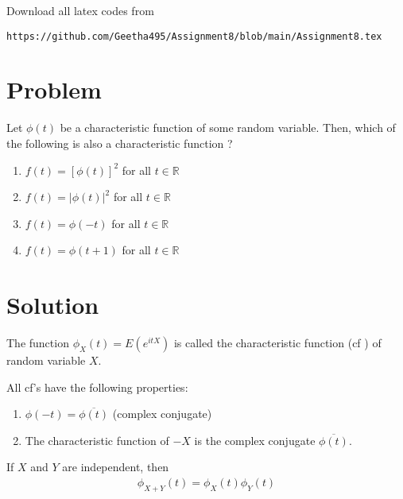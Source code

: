\documentclass[journal,12pt,twocolumn]{IEEEtran}
\begin{document}
Download all latex codes from 
\begin{lstlisting}
https://github.com/Geetha495/Assignment8/blob/main/Assignment8.tex
\end{lstlisting}
\section{Problem}
Let $\phi(t)$ be a characteristic function of some random variable.  Then, which of the following is also a characteristic function ?
\begin{enumerate}
    \item $f(t) = [\phi(t)]^2$ for all $t \in \mathbb{R}$
    \item $f(t) = |\phi(t)|^2$ for all $t \in \mathbb{R}$
    \item $f(t) = \phi(-t)$ for all $t \in \mathbb{R}$
    \item $f(t) = \phi(t+1)$ for all $t \in \mathbb{R}$
\end{enumerate}
\section{Solution}
\begin{definition}
 The function $\phi_X(t) = E(e^{itX})$ is called the characteristic function (cf ) of random variable $X$.
\end{definition}

\begin{proposition}
All cf’s have the following properties:\\
\begin{enumerate}
    \item $\phi(-t) =\overline{\phi(t)}$ (complex conjugate)
    \item  The characteristic function of  $ -X$ is the complex conjugate $\overline{\phi(t)}$.
\end{enumerate}
\end{proposition}
\begin{proposition}
 If $X$ and $Y$ are independent, then
 \begin{align*}
     \phi_{X+Y}(t) = \phi_X(t)\phi_Y(t)
 \end{align*}
\end{proposition}
\end{document}
